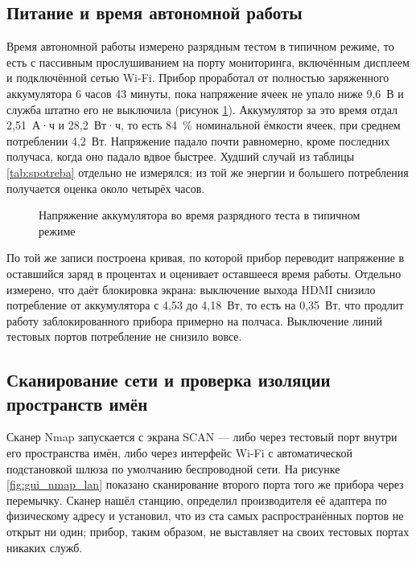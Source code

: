 \subsection{Питание и время автономной работы}
\label{sec:overeni_napajeni}

Время автономной работы измерено разрядным тестом в типичном режиме, то есть с пассивным прослушиванием на порту мониторинга, включённым дисплеем и подключённой сетью Wi-Fi. Прибор проработал от полностью заряженного аккумулятора 6 часов 43 минуты, пока напряжение ячеек не упало ниже 9,6~В и служба штатно его не выключила (рисунок \ref{fig:graf_vybijeni}). Аккумулятор за это время отдал 2,51~А·ч и 28,2~Вт·ч, то есть 84~\% номинальной ёмкости ячеек, при среднем потреблении 4,2~Вт. Напряжение падало почти равномерно, кроме последних получаса, когда оно падало вдвое быстрее. Худший случай из таблицы \ref{tab:spotreba} отдельно не измерялся; из той же энергии и большего потребления получается оценка около четырёх часов.

\begin{figure}[htbp]
    \centering
    
    \caption{Напряжение аккумулятора во время разрядного теста в типичном режиме}
    \label{fig:graf_vybijeni}
\end{figure}

По той же записи построена кривая, по которой прибор переводит напряжение в оставшийся заряд в процентах и оценивает оставшееся время работы. Отдельно измерено, что даёт блокировка экрана: выключение выхода HDMI снизило потребление от аккумулятора с 4,53 до 4,18~Вт, то есть на 0,35~Вт, что продлит работу заблокированного прибора примерно на полчаса. Выключение линий тестовых портов потребление не снизило вовсе.

\subsection{Сканирование сети и проверка изоляции пространств имён}
\label{sec:skenovani}

Сканер Nmap запускается с экрана SCAN — либо через тестовый порт внутри его пространства имён, либо через интерфейс Wi-Fi с автоматической подстановкой шлюза по умолчанию беспроводной сети. На рисунке \ref{fig:gui_nmap_lan} показано сканирование второго порта того же прибора через перемычку. Сканер нашёл станцию, определил производителя её адаптера по физическому адресу и установил, что из ста самых распространённых портов не открыт ни один; прибор, таким образом, не выставляет на своих тестовых портах никаких служб.

